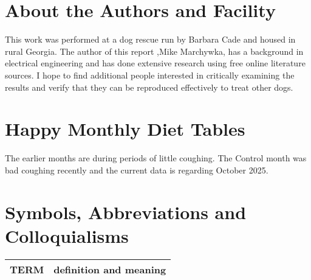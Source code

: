 \begin{mdpicomment}
\section{About the Authors and Facility}
This work was performed at a dog rescue run by Barbara Cade and
housed in rural Georgia.  The author of this report 
,Mike Marchywka,
has a background in electrical engineering and 
has done extensive research using free online literature sources.  
I hope to find additional people interested in critically 
examining the results and verify that they can be reproduced
effectively to treat other dogs.

\begin{comment}
\begin{figure}[htb] 
\centering
\mjmed{ picture commented out to save space in drafts...  } 
\caption{ 
 }
\end{figure}

\end{comment}

\section{Happy Monthly Diet Tables}
\label{appendix:diettab}
The earlier months are during periods of little coughing.
The Control month was bad coughing recently and the current
data is regarding October 2025.

\section{Symbols, Abbreviations and Colloquialisms}

\begin{comment}
\end{comment}


\noindent
\begin{tabular}{@{}ll}
TERM & definition and meaning   \\
\hline
\end{tabular} %


\end{mdpicomment}
